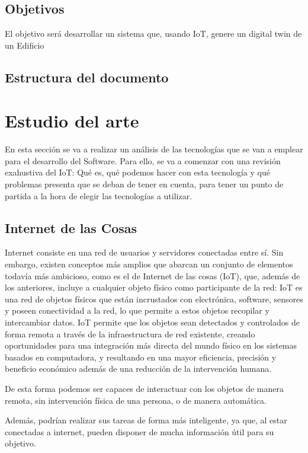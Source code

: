 \documentclass[12pt, a4paper, twoside]{article}
\begin{document}
    \blindtext[4]
\subsection{Objetivos}
El objetivo será desarrollar un sistema que, usando IoT, genere un digital twin de un Edificio
\subsection{Estructura del documento}

\section{Estudio del arte \\}
En esta sección se va a realizar un análisis de las tecnologías que se van a emplear para el 
desarrollo del Software. Para ello, se va a comenzar con una revisión exahustiva del IoT: 
Qué es, qué podemos hacer con esta tecnología y qué problemas presenta que se deban de tener en cuenta,
 para tener un punto de partida a la hora de elegir las tecnologías a utilizar.
 \subsection{Internet de las Cosas}
 Internet consiste en una red de usuarios y servidores conectadas entre sí.
 Sin embargo, existen conceptos más amplios que abarcan un conjunto de elementos todavía más ambicioso,
 como es el de Internet de las cosas (IoT), que, además de los anteriores, incluye a cualquier 
 objeto físico como participante de la red: IoT es una red de objetos físicos que están incrustados 
 con electrónica, software, sensores y poseen conectividad a la red, lo que permite a estos objetos
 recopilar y intercambiar datos. IoT permite que los objetos sean detectados y controlados de forma 
 remota a través de la  infraestructura de red existente, creando oportunidades para una integración 
 más directa del mundo físico en los sistemas basados en computadora, y resultando en una mayor 
 eficiencia, precisión y beneficio económico además de una reducción de la intervención humana. 
 
 De esta forma podemos ser capaces de interactuar con los objetos de manera remota, sin intervención física de
 una persona, o de manera automática.
 
 Además, podrían realizar sus tareas de forma más inteligente, ya que, al estar conectadas a internet, pueden
 disponer de mucha información útil para su objetivo.
\end{document}
